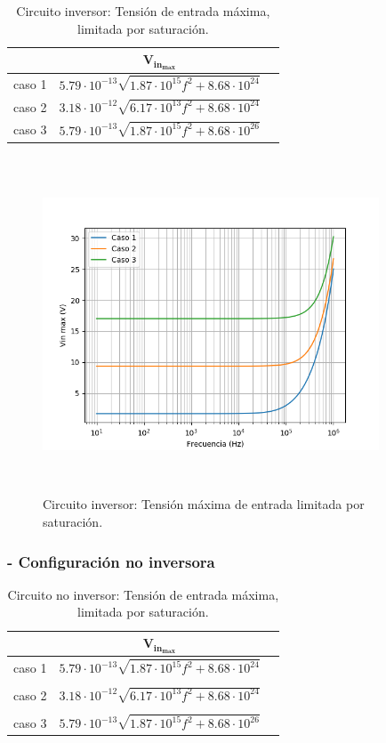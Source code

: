 \begin{table}[h!]
	\centering
	\begin{tabular}{c c c }%
		\bfseries  & $\bm{V_{in_{max}}}$ \\ \hline
		caso 1 & $5.79 \cdot 10^{-13} \sqrt{1.87 \cdot 10^{15} f^{2} + 8.68 \cdot 10^{24}}$\\
		caso 2 & $3.18 \cdot 10^{-12} \sqrt{6.17 \cdot 10^{13} f^{2} + 8.68 \cdot 10^{24}}$ \\
		caso 3 & $5.79 \cdot 10^{-13} \sqrt{1.87 \cdot 10^{15} f^{2} + 8.68 \cdot 10^{26}}$\\
		\hline
	\end{tabular}
	\caption{Circuito inversor: Tensi\'on de entrada m\'axima, limitada por saturaci\'on.}
	\label{vin_maxS}
\end{table}


\begin{figure}[H] %
	\centering
	\includegraphics[width=10cm,height=10cm,keepaspectratio]{../EJ1/00GRAFICOS/teoricos/c1sat.png}
	\caption{Circuito inversor: Tensi\'on m\'axima de entrada limitada por saturaci\'on.}
	\label{c1sat}
\end{figure}

\subsubsection*{- Configuraci\'on no inversora}

\begin{table}[h!]
	\centering
	\begin{tabular}{c c c }%
		\bfseries  & $\bm{V_{in_{max}}}$ \\ \hline
		caso 1 & $ 5.79 \cdot 10^{-13} \sqrt{1.87 \cdot 10^{15} f^{2} + 8.68 \cdot 10^{24}}$\\ \\
		caso 2 & $3.18 \cdot 10^{-12} \sqrt{6.17 \cdot 10^{13} f^{2} + 8.68 \cdot 10^{24}}$ \\ \\
		caso 3 & $5.79 \cdot 10^{-13} \sqrt{1.87 \cdot 10^{15} f^{2} + 8.68 \cdot 10^{26}} $\\
		\hline
	\end{tabular}
	\caption{Circuito no inversor: Tensi\'on de entrada m\'axima, limitada por saturaci\'on.}
	\label{vin_maxS}
\end{table}


